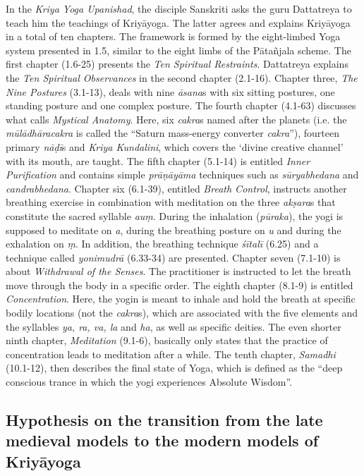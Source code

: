 In the \textit{Kriya Yoga Upanishad}, the disciple Sanskriti asks the guru Dattatreya to teach him the teachings of Kriyāyoga. The latter agrees and explains Kriyāyoga in a total of ten chapters. The framework is formed by the eight-limbed Yoga system presented in 1.5, similar to the eight limbs of the Pātañjala scheme. The first chapter (1.6-25) presents the \textit{Ten Spiritual Restraints}. Dattatreya explains the \textit{Ten Spiritual Observances} in the second chapter (2.1-16). Chapter three, \textit{The Nine Postures} (3.1-13), deals with nine \textit{āsana}s with six sitting postures, one standing posture and one complex posture. The fourth chapter (4.1-63) discusses what \citeauthor{kriyayogaupanishad1993} calls \textit{Mystical Anatomy}. Here, six \textit{cakra}s named after the planets (i.e. the \textit{mūlādhāracakra} is called the ``Saturn mass-energy converter \textit{cakra}''), fourteen primary \textit{nāḍī}s and \textit{Kriya Kundalini}, which covers the `divine creative channel' with its mouth, are taught. The fifth chapter (5.1-14) is entitled \textit{Inner Purification} and contains simple \textit{prāṇāyāma} techniques such as \textit{sūryabhedana} and \textit{candrabhedana}. Chapter six (6.1-39), entitled \textit{Breath Control}, instructs another breathing exercise in combination with meditation on the three \textit{akṣara}s that constitute the sacred syllable \textit{auṃ}. During the inhalation (\textit{pūraka}), the yogi is supposed to meditate on \textit{a}, during the breathing posture on \textit{u} and during the exhalation on \textit{ṃ}. In addition, the breathing technique \textit{śītalī} (6.25) and a technique called \textit{yonimudrā} (6.33-34) are presented. Chapter seven (7.1-10) is about \textit{Withdrawal of the Senses}. The practitioner is instructed to let the breath move through the body in a specific order. The eighth chapter (8.1-9) is entitled \textit{Concentration}. Here, the yogin is meant to inhale and hold the breath at specific bodily locations (not the \textit{cakra}s), which are associated with the five elements and the syllables \textit{ya, ra, va, la} and \textit {ha}, as well as specific deities. The even shorter ninth chapter, \textit{Meditation} (9.1-6), basically only states that the practice of concentration leads to meditation after a while. The tenth chapter, \textit{Samadhi} (10.1-12), then describes the final state of Yoga, which is defined as the ``deep conscious trance in which the yogi experiences Absolute Wisdom''.

\subsection{Hypothesis on the transition from the late medieval models to the modern models of Kriyāyoga}


